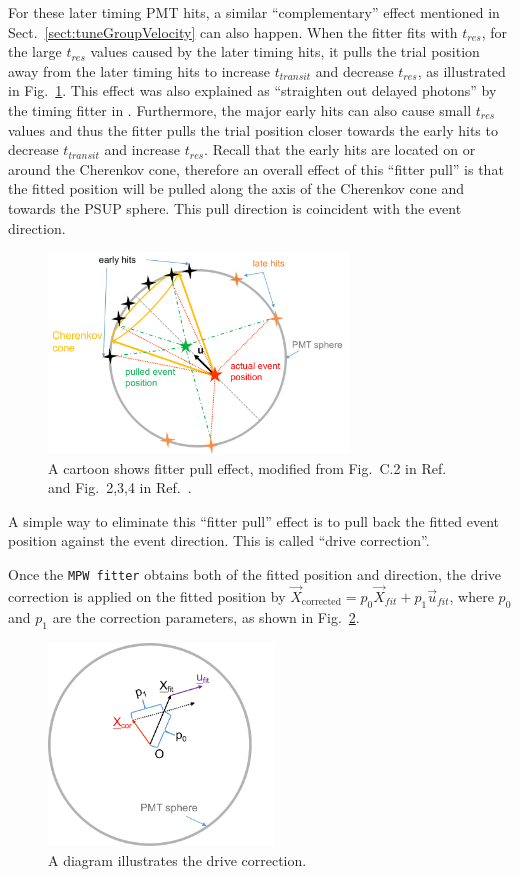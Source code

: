For these later timing PMT hits, a similar ``complementary'' effect mentioned in Sect.~\ref{sect:tuneGroupVelocity} can also happen. When the fitter fits with $t_{res}$, for the large $t_{res}$ values caused by the later timing hits, it pulls the trial position away from the later timing hits to increase $t_{transit}$ and decrease $t_{res}$, as illustrated in Fig.~\ref{fitterPull}. This effect was also explained as ``straighten out delayed photons'' by the timing fitter in \cite{driveCorPeter}. Furthermore, the major early hits can also cause small $t_{res}$ values and thus the fitter pulls the trial position closer towards the early hits to decrease $t_{transit}$ and increase $t_{res}$. Recall that the early hits are located on or around the Cherenkov cone, therefore an overall effect of this ``fitter pull'' is that the fitted position will be pulled along the axis of the Cherenkov cone and towards the PSUP sphere. This pull direction is coincident with the event direction.

\begin{figure}[!htb]
	\centering
	\includegraphics[width=8cm]{fitterPull.png}
\caption[A cartoon shows fitter pull effect.]{A cartoon shows fitter pull effect, modified from Fig.~C.2 in Ref.~\cite{brice1996monte} and Fig.~2,3,4 in Ref.~\cite{driveCorPeter}.}
	\label{fitterPull}
\end{figure}

A simple way to eliminate this ``fitter pull'' effect is to pull back the fitted event position against the event direction. This is called ``drive correction''.   

Once the \texttt{MPW fitter} obtains both of the fitted position and direction, the drive correction is applied on the fitted position by $\vec{X}_{\mathrm{corrected}} = p_0\vec{X}_{fit}+p_1\vec{u}_{fit}$, where $p_0$ and $p_1$ are the correction parameters, as shown in Fig.~\ref{drivecor}.
\begin{figure}[!htb]
	\centering
	\includegraphics[width=6cm]{driveCor.png}
	\caption{ A diagram illustrates the drive correction.}
	\label{drivecor}
\end{figure}

